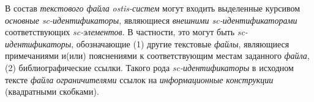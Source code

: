     В состав \textit{текстового файла} \textit{ostis-систем} могут входить выделенные курсивом \textit{основные sc-идентификаторы}, являющиеся \textit{внешними sc-идентификаторами} соответствующих \textit{sc-элементов}.
    В частности, это могут быть \textit{sc-идентификаторы}, обозначающие (1) другие текстовые \textit{файлы}, являющиеся примечаниями и(или) пояснениями к соответствующим местам заданного \textit{файла}, (2) библиографические ссылки.
    Такого рода \textit{sc-идентификаторы} в исходном тексте \textit{файла} \textit{ограничителями} ссылок на \textit{информационные конструкции} (квадратными скобками).

\begin{SCn}

        \begin{scnindent}
        \end{scnindent}

\end{SCn}

%
